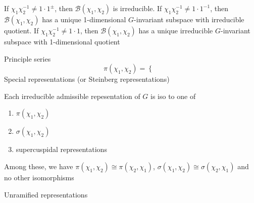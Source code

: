 \documentclass[main]{subfiles}
\begin{document}
\begin{theorem}
If $\chi_1\chi_2^{-1}\neq1\cdot1^{\pm}$, then $\mathcal B(\chi_1,\chi_2)$ is irreducible. If $\chi_1\chi_2^{-1}\neq1\cdot1^{-1}$, then $\mathcal B(\chi_1,\chi_2)$ has a unique 1-dimensional $G$-invariant subspace with irreducible quotient. If $\chi_1\chi_2^{-1}\neq1\cdot1$, then $\mathcal B(\chi_1,\chi_2)$ has a unique irreducible $G$-invariant subspace with 1-dimensional quotient
\end{theorem}

\begin{definition}
Principle series
\[\pi(\chi_1,\chi_2)=\begin{cases}

\end{cases}\]
Special representations (or Steinberg representations)
\end{definition}

\begin{theorem}
Each irreducible admissible repesentation of $G$ is iso to one of
\begin{enumerate}[label=)(\arabic*)]
\item $\pi(\chi_1,\chi_2)$
\item $\sigma(\chi_1,\chi_2)$
\item supercuspidal representations
\end{enumerate}
Among these, we have $\pi(\chi_1,\chi_2)\cong \pi(\chi_2,\chi_1)$, $\sigma(\chi_1,\chi_2)\cong \sigma(\chi_2,\chi_1)$ and no other isomorphisms
\end{theorem}

\begin{remark}

\end{remark}

Unramified representations
\begin{definition}

\end{definition}
\end{document}
